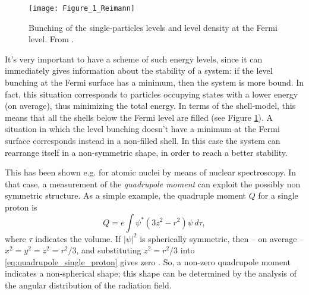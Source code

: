 \begin{figure}[H]
	\centering
    \texttt{[image: Figure\_1\_Reimann]}
    \caption{Bunching of the single-particles levels and level density at the Fermi level. From \cite{Brack1972}.}
	\label{fig:Figure_1_Reimann}
\end{figure}

It's very important to have a scheme of such energy levels, since it can immediately gives information about the stability of a system: if the level bunching at the Fermi surface has a minimum, then the system is more bound. In fact, this situation corresponds to particles occupying states with a lower energy (on average), thus minimizing the total energy. In terms of the shell-model, this means that all the shells below the Fermi level are filled (see Figure \ref{fig:Figure_1_Reimann}). A situation in which the level bunching doesn't have a minimum at the Fermi surface corresponds instead in a non-filled shell. In this case the system can rearrange itself in a non-symmetric shape, in order to reach a better stability.

This has been shown e.g. for atomic nuclei by means of nuclear spectroscopy. In that case, a measurement of the \emph{quadrupole moment} can exploit the possibly non symmetric structure. As a simple example, the quadruple moment $Q$ for a single proton is
\begin{equation}
	Q = e \int \psi^*(3z^2-r^2)\psi\,d\tau,
	\label{eq:quadrupole_single_proton}
\end{equation}
where $\tau$ indicates the volume. If $|\psi|^2$ is spherically symmetric, then -- on average -- $x^2=y^2=z^2=r^2/3$, and substituting $z^2=r^2/3$ into \eqref{eq:quadrupole_single_proton} gives zero \citep[see][]{Krane1988}. So, a non-zero quadrupole moment indicates a non-spherical shape; this shape can be determined by the analysis of the angular distribution of the radiation field.

